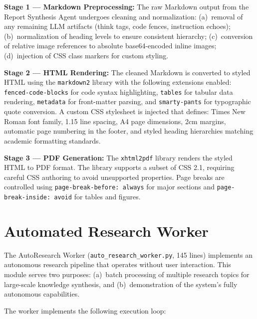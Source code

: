 \documentclass[a4paper,12pt,openany]{report}
\begin{document}
\textbf{Stage 1 --- Markdown Preprocessing:} The raw Markdown output from the Report Synthesis Agent undergoes cleaning and normalization: (a)~removal of any remaining LLM artifacts (think tags, code fences, instruction echoes); (b)~normalization of heading levels to ensure consistent hierarchy; (c)~conversion of relative image references to absolute base64-encoded inline images; (d)~injection of CSS class markers for custom styling.

\textbf{Stage 2 --- HTML Rendering:} The cleaned Markdown is converted to styled HTML using the \texttt{markdown2} library with the following extensions enabled: \texttt{fenced-code-blocks} for code syntax highlighting, \texttt{tables} for tabular data rendering, \texttt{metadata} for front-matter parsing, and \texttt{smarty-pants} for typographic quote conversion. A custom CSS stylesheet is injected that defines: Times New Roman font family, 1.15 line spacing, A4 page dimensions, 2cm margins, automatic page numbering in the footer, and styled heading hierarchies matching academic formatting standards.

\textbf{Stage 3 --- PDF Generation:} The \texttt{xhtml2pdf} library renders the styled HTML to PDF format. The library supports a subset of CSS 2.1, requiring careful CSS authoring to avoid unsupported properties. Page breaks are controlled using \texttt{page-break-before: always} for major sections and \texttt{page-break-inside: avoid} for tables and figures.

\section{Automated Research Worker}

The AutoResearch Worker (\texttt{auto\_research\_worker.py}, 145 lines) implements an autonomous research pipeline that operates without user interaction. This module serves two purposes: (a)~batch processing of multiple research topics for large-scale knowledge synthesis, and (b)~demonstration of the system's fully autonomous capabilities.

The worker implements the following execution loop:
\end{document}

